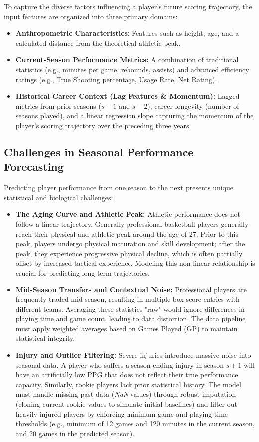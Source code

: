 \documentclass[conference]{IEEEtran}
\begin{document}
To capture the diverse factors influencing a player's future scoring trajectory, the input features are organized into three primary domains:
\begin{itemize}
    \item \textbf{Anthropometric Characteristics:} Features such as height, age, and a calculated distance from the theoretical athletic peak.
    \item \textbf{Current-Season Performance Metrics:} A combination of traditional statistics (e.g., minutes per game, rebounds, assists) and advanced efficiency ratings (e.g., True Shooting percentage, Usage Rate, Net Rating).
    \item \textbf{Historical Career Context (Lag Features \& Momentum):} Lagged metrics from prior seasons ($s-1$ and $s-2$), career longevity (number of seasons played), and a linear regression slope capturing the momentum of the player's scoring trajectory over the preceding three years.
\end{itemize}

\subsection{Challenges in Seasonal Performance Forecasting}
Predicting player performance from one season to the next presents unique statistical and biological challenges:
\begin{itemize}
    \item \textbf{The Aging Curve and Athletic Peak:} Athletic performance does not follow a linear trajectory. Generally professional basketball players generally reach their physical and athletic peak around the age of 27. Prior to this peak, players undergo physical maturation and skill development; after the peak, they experience progressive physical decline, which is often partially offset by increased tactical experience. Modeling this non-linear relationship is crucial for predicting long-term trajectories.
    \item \textbf{Mid-Season Transfers and Contextual Noise:} Professional players are frequently traded mid-season, resulting in multiple box-score entries with different teams. Averaging these statistics "raw" would ignore differences in playing time and game count, leading to data distortion. The data pipeline must apply weighted averages based on Games Played (GP) to maintain statistical integrity.
    \item \textbf{Injury and Outlier Filtering:} Severe injuries introduce massive noise into seasonal data. A player who suffers a season-ending injury in season $s+1$ will have an artificially low PPG that does not reflect their true performance capacity. Similarly, rookie players lack prior statistical history. The model must handle missing past data (\textit{NaN} values) through robust imputation (cloning current rookie values to simulate initial baselines) and filter out heavily injured players by enforcing minimum game and playing-time thresholds (e.g., minimum of 12 games and 120 minutes in the current season, and 20 games in the predicted season).
\end{itemize}
\end{document}
